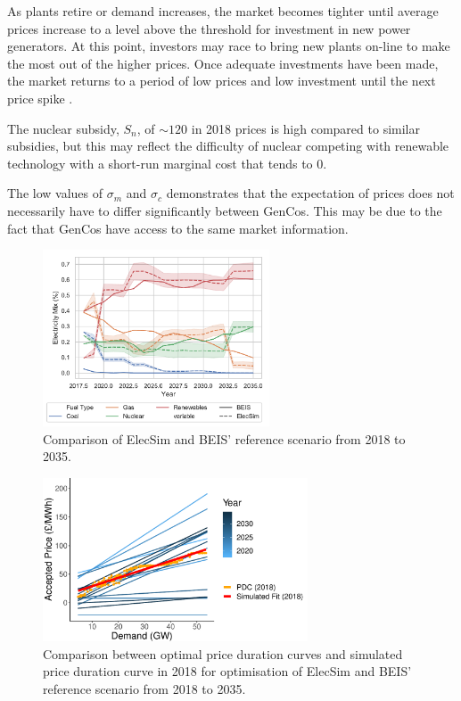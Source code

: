 As plants retire or demand increases, the market becomes tighter until average prices increase to a level above the threshold for investment in new power generators. At this point, investors may race to bring new plants on-line to make the most out of the higher prices. Once adequate investments have been made, the market returns to a period of low prices and low investment until the next price spike \cite{Gross2007}. 


The nuclear subsidy, $S_n$, of ${\sim}$\textsterling $120$ in 2018 prices is high compared to similar subsidies, but this may reflect the difficulty of nuclear competing with renewable technology with a short-run marginal cost that tends to \textsterling $0$.

The low values of $\sigma_m$ and $\sigma_c$ demonstrates that the expectation of prices does not necessarily have to differ significantly between GenCos. This may be due to the fact that GenCos have access to the same market information.


\begin{figure}
	\centering
	\includegraphics[width=0.60\textwidth]{Chapter4/figures/e-Energy-2020/results/scenario_analysis/best_forward_scenario_below_legend.pdf}
	\caption{Comparison of ElecSim and BEIS' reference scenario from 2018 to 2035.}
	\label{fig:forward_scenario_beis_elecsim}
\end{figure}



\begin{figure}
	\centering
	\includegraphics[width=0.7\textwidth, keepaspectratio]{Chapter4/figures/e-Energy-2020/results/scenario_analysis/optimal_pdc_prices.pdf}
	\caption{Comparison between optimal price duration curves and simulated price duration curve in 2018 for optimisation of ElecSim and BEIS' reference scenario from 2018 to 2035.}
	\label{fig:forward_scenario_best_pdcs}
\end{figure}


